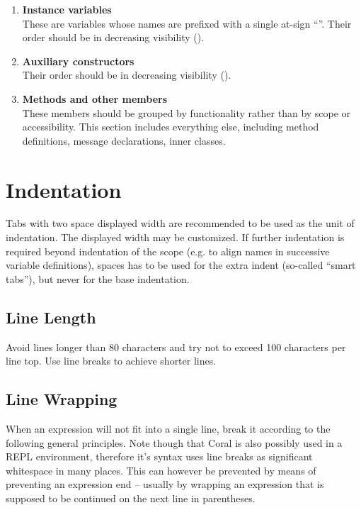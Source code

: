 \begin{enumerate}
\item {\bfseries Instance variables} \hfill \\
These are variables whose names are prefixed with a single at-sign ``''. Their order should be in decreasing visibility ().

\item {\bfseries Auxiliary constructors} \hfill \\
Their order should be in decreasing visibility ().

\item {\bfseries Methods and other members} \hfill \\
These members should be grouped by functionality rather than by scope or accessibility. This section includes everything else, including method definitions, message declarations, inner classes. 
\end{enumerate}





\section{Indentation}

Tabs with two space displayed width are recommended to be used as the unit of indentation. The displayed width may be customized. If further indentation is required beyond indentation of the scope (e.g. to align names in successive variable definitions), spaces has to be used for the extra indent (so-called ``smart tabs''), but never for the base indentation. 





\subsection{Line Length}

Avoid lines longer than 80 characters and try not to exceed 100 characters per line top. Use line breaks to achieve shorter lines. 






\subsection{Line Wrapping}

When an expression will not fit into a single line, break it according to the following general principles. Note though that Coral is also possibly used in a REPL environment, therefore it's syntax uses line breaks as significant whitespace in many places. This can however be prevented by means of preventing an expression end -- usually by wrapping an expression that is supposed to be continued on the next line in parentheses. 

